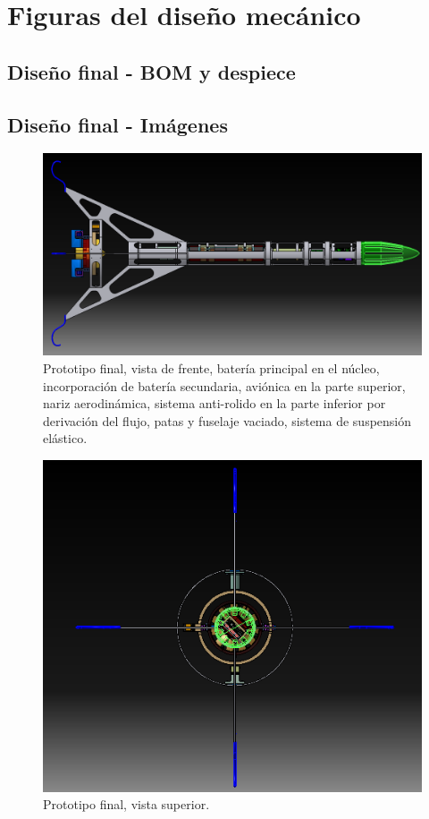 \section{Figuras del diseño mecánico}


\null\newpage
\clearpage

\subsection{Diseño final - BOM y despiece}


\subsection{Diseño final - Imágenes}
\begin{figure}[htb]
    \centering
    \includegraphics[width=\linewidth]{fig/design/v6}
    \caption{Prototipo final, vista de frente, batería principal en el núcleo, incorporación de batería secundaria, aviónica en la parte superior, nariz aerodinámica, sistema anti-rolido en la parte inferior por derivación del flujo, patas y fuselaje vaciado, sistema de suspensión elástico.}
    \label{fig:design/v6}
\end{figure}

\begin{figure}[htb]
    \centering
    \includegraphics[width=0.8\linewidth]{fig/design/v6_1}
    \caption{Prototipo final, vista superior.}
    \label{fig:design/v6_1}
\end{figure}


